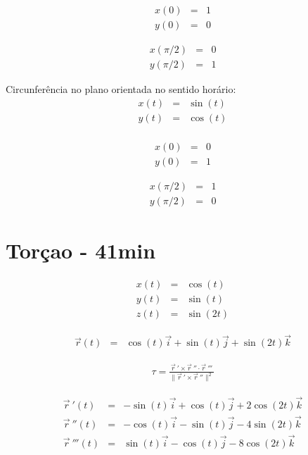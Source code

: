 \documentclass[a4paper,10pt]{book}
\begin{document}
\begin{eqnarray*}
  x(0) &=& 1\\
  y(0) &=& 0
 \end{eqnarray*}

 \begin{eqnarray*}
  x(\pi/2) &=& 0\\
  y(\pi/2) &=& 1
 \end{eqnarray*}
 
 
 
 Circunferência no plano orientada no sentido horário:
 \begin{eqnarray*}
  x(t) &=& \sin(t)\\
  y(t) &=& \cos(t)\\
 \end{eqnarray*}
 
\begin{eqnarray*}
  x(0) &=& 0\\
  y(0) &=& 1
 \end{eqnarray*}

 \begin{eqnarray*}
  x(\pi/2) &=& 1\\
  y(\pi/2) &=& 0
 \end{eqnarray*}
 

 \section{Torçao - 41min}
 \begin{eqnarray*}
  x(t) &=& \cos(t)\\
  y(t) &=& \sin(t)\\
  z(t) &=& \sin(2t)
 \end{eqnarray*}
 
 \begin{eqnarray*}
  \vec{r}(t) &=& \cos(t)\vec{i}+\sin(t)\vec{j}+ \sin(2t)\vec{k}
 \end{eqnarray*}
 

  \begin{eqnarray*}
\tau = \frac{\vec{r}\!~'\times\vec{r}\!~''\cdot \vec{r}\!~'''}{\|\vec{r}\!~'\times\vec{r}\!~''\|^2}
  \end{eqnarray*}

 \begin{eqnarray*}
  \vec{r}\!~'(t) &=& -\sin(t)\vec{i}+\cos(t)\vec{j}+
  2\cos(2t)\vec{k}\\
  \vec{r}\!~''(t) &=& -\cos(t)\vec{i}-\sin(t)\vec{j}-4\sin(2t)\vec{k}\\
  \vec{r}\!~'''(t) &=& \sin(t)\vec{i}-\cos(t)\vec{j}-
  8\cos(2t)\vec{k}
 \end{eqnarray*}
\end{document}
